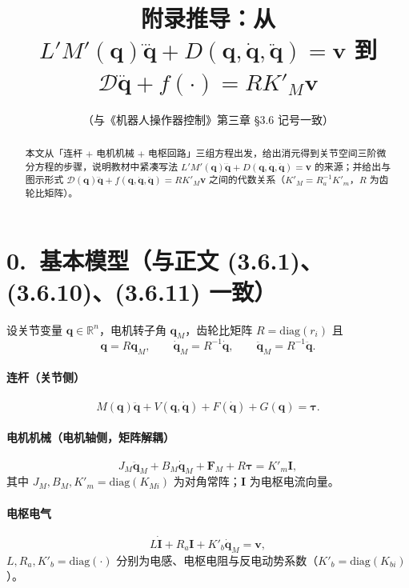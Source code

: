 \documentclass[UTF8,a4paper,12pt]{ctexart}
\title{附录推导：从 $L'M'(\bm{q})\dddot{\bm{q}}+D(\bm{q},\dot{\bm{q}},\ddot{\bm{q}})=\bm{v}$ 到 $\mathcal{D}\dddot{\bm{q}}+f(\cdot)=R K'_M \bm{v}$}
\author{（与《机器人操作器控制》第三章 \S3.6 记号一致）}
\date{}
\begin{document}
\maketitle

\begin{abstract}
本文从「连杆 $+$ 电机机械 $+$ 电枢回路」三组方程出发，给出消元得到关节空间三阶微分方程的步骤，说明教材中紧凑写法
$L'M'(\bm{q})\dddot{\bm{q}}+D(\bm{q},\dot{\bm{q}},\ddot{\bm{q}})=\bm{v}$
的来源；并给出与图示形式
$\mathcal{D}(\bm{q})\dddot{\bm{q}}+f(\bm{q},\dot{\bm{q}},\ddot{\bm{q}})=R K'_M \bm{v}$
之间的代数关系（$K'_M=R_a^{-1}K'_m$，$R$ 为齿轮比矩阵）。
\end{abstract}

\section*{0.\ 基本模型（与正文 (3.6.1)、(3.6.10)、(3.6.11) 一致）}

设关节变量 $\bm{q}\in\mathbb{R}^n$，电机转子角 $\bm{q}_M$，齿轮比矩阵 $R=\mathrm{diag}(r_i)$ 且
\begin{equation}
\bm{q}=R\bm{q}_M,\qquad \dot{\bm{q}}_M=R^{-1}\dot{\bm{q}},\qquad \ddot{\bm{q}}_M=R^{-1}\ddot{\bm{q}} .
\end{equation}

\paragraph{连杆（关节侧）}
\begin{equation}
M(\bm{q})\ddot{\bm{q}}+V(\bm{q},\dot{\bm{q}})+F(\dot{\bm{q}})+G(\bm{q})=\bm{\tau}.
\label{eq:link}
\end{equation}

\paragraph{电机机械（电机轴侧，矩阵解耦）}
\begin{equation}
J_M\ddot{\bm{q}}_M+B_M\dot{\bm{q}}_M+\bm{F}_M+R\bm{\tau}=K'_m \bm{I},
\label{eq:motor-mech}
\end{equation}
其中 $J_M,B_M,K'_m=\mathrm{diag}(K_{Mi})$ 为对角常阵；$\bm{I}$ 为电枢电流向量。

\paragraph{电枢电气}
\begin{equation}
L\dot{\bm{I}}+R_a\bm{I}+K'_b\dot{\bm{q}}_M=\bm{v},
\label{eq:electric}
\end{equation}
$L,R_a,K'_b=\mathrm{diag}(\cdot)$ 分别为电感、电枢电阻与反电动势系数（$K'_b=\mathrm{diag}(K_{bi})$）。
\end{document}
